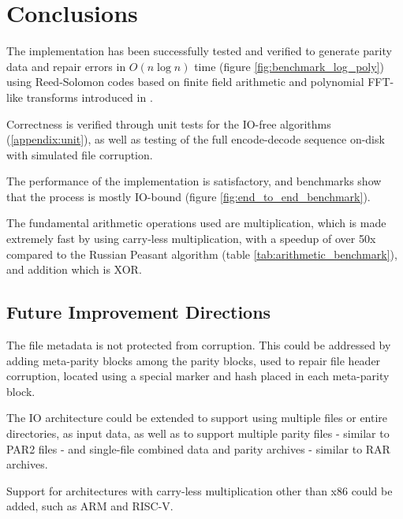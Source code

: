 \chapter{Conclusions}

The implementation has been successfully tested and verified to generate parity data and repair errors in $O(n \log n)$ time (figure \ref{fig:benchmark_log_poly})
using Reed-Solomon codes based on finite field arithmetic and polynomial FFT-like transforms introduced in \cite{novel-poly}.

Correctness is verified through unit tests for the IO-free algorithms (\ref{appendix:unit}), as well as testing of the full encode-decode sequence on-disk with simulated file corruption.

The performance of the implementation is satisfactory, and benchmarks show that the process is mostly IO-bound (figure \ref{fig:end_to_end_benchmark}).

The fundamental arithmetic operations used are  multiplication, which is made extremely fast by using carry-less multiplication,
with a speedup of over 50x compared to the Russian Peasant algorithm (table \ref{tab:arithmetic_benchmark}), and  addition which is XOR.

\vspace{-1.5em}
\section{Future Improvement Directions}
\vspace{-0.5em}

The file metadata is not protected from corruption. This could be addressed by adding meta-parity blocks among the parity blocks, used to repair file header corruption, located using a special marker and hash placed in each meta-parity block.

The IO architecture could be extended to support using multiple files or entire directories, as input data, as well as to support multiple parity files - similar to PAR2 files - and single-file combined data and parity archives - similar to RAR archives.

Support for architectures with carry-less multiplication other than x86 could be added, such as ARM and RISC-V.

